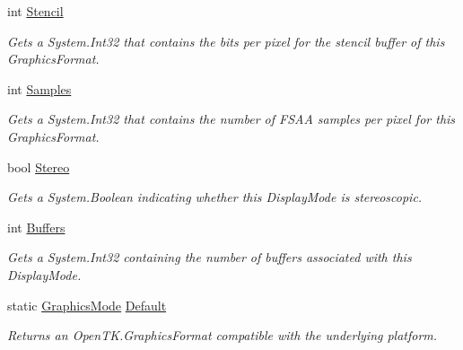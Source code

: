 \begin{DoxyCompactItemize}
int \hyperlink{class_open_t_k_1_1_graphics_1_1_graphics_mode_a962610eb764cb1f680149d17584606e1}{Stencil}
\begin{DoxyCompactList}\small\item\em Gets a System.\-Int32 that contains the bits per pixel for the stencil buffer of this Graphics\-Format. \end{DoxyCompactList}\item 
int \hyperlink{class_open_t_k_1_1_graphics_1_1_graphics_mode_a3e7936c43e4aa0c05645bbd5270b5365}{Samples}
\begin{DoxyCompactList}\small\item\em Gets a System.\-Int32 that contains the number of F\-S\-A\-A samples per pixel for this Graphics\-Format. \end{DoxyCompactList}\item 
bool \hyperlink{class_open_t_k_1_1_graphics_1_1_graphics_mode_a3e966d924fdbc2939fb02139456d7bd1}{Stereo}
\begin{DoxyCompactList}\small\item\em Gets a System.\-Boolean indicating whether this Display\-Mode is stereoscopic. \end{DoxyCompactList}\item 
int \hyperlink{class_open_t_k_1_1_graphics_1_1_graphics_mode_a6a53197afd7dc314e2d42a7d22c16bfe}{Buffers}
\begin{DoxyCompactList}\small\item\em Gets a System.\-Int32 containing the number of buffers associated with this Display\-Mode. \end{DoxyCompactList}\item 
static \hyperlink{class_open_t_k_1_1_graphics_1_1_graphics_mode}{Graphics\-Mode} \hyperlink{class_open_t_k_1_1_graphics_1_1_graphics_mode_a3280654ce982edbd728f83c06cd21c07}{Default}
\begin{DoxyCompactList}\small\item\em Returns an Open\-T\-K.\-Graphics\-Format compatible with the underlying platform.\end{DoxyCompactList}\end{DoxyCompactItemize}


